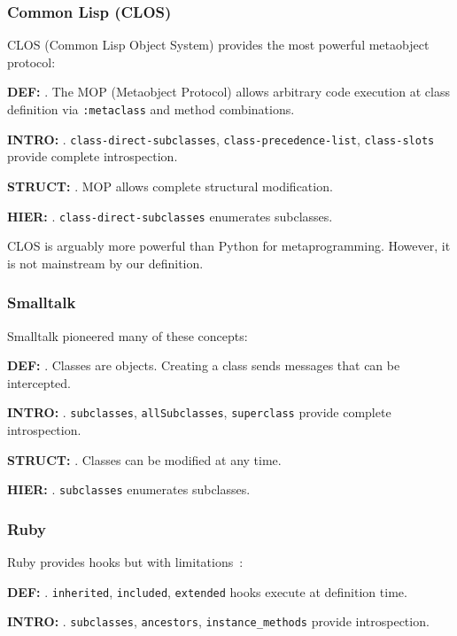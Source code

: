 \subsubsection{Common Lisp (CLOS)}

CLOS (Common Lisp Object System) provides the most powerful metaobject protocol:

\textbf{DEF:} \checkmark. The MOP (Metaobject Protocol) allows arbitrary code execution at class definition via \texttt{:metaclass} and method combinations.

\textbf{INTRO:} \checkmark. \texttt{class-direct-subclasses}, \texttt{class-precedence-list}, \texttt{class-slots} provide complete introspection.

\textbf{STRUCT:} \checkmark. MOP allows complete structural modification.

\textbf{HIER:} \checkmark. \texttt{class-direct-subclasses} enumerates subclasses.

CLOS is arguably more powerful than Python for metaprogramming. However, it is not mainstream by our definition.

\subsubsection{Smalltalk}

Smalltalk pioneered many of these concepts:

\textbf{DEF:} \checkmark. Classes are objects. Creating a class sends messages that can be intercepted.

\textbf{INTRO:} \checkmark. \texttt{subclasses}, \texttt{allSubclasses}, \texttt{superclass} provide complete introspection.

\textbf{STRUCT:} \checkmark. Classes can be modified at any time.

\textbf{HIER:} \checkmark. \texttt{subclasses} enumerates subclasses.

\subsubsection{Ruby}

Ruby provides hooks but with limitations~\cite{flanagan2020ruby}:

\textbf{DEF:} \checkmark. \texttt{inherited}, \texttt{included}, \texttt{extended} hooks execute at definition time.

\textbf{INTRO:} \checkmark. \texttt{subclasses}, \texttt{ancestors}, \texttt{instance\_methods} provide introspection.

